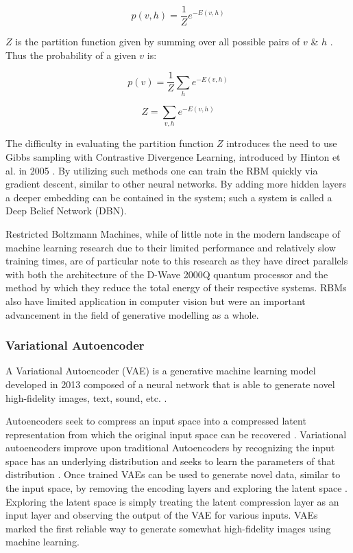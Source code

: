 \documentclass[%
 reprint,
 amsmath,amssymb,
 aps,
]{revtex4-2}
\begin{document}
\begin{equation}
p(v, h) = \frac{1}{Z}e^{-E(v,h)}
\end{equation}



$Z$ is the partition function given by summing over all possible pairs of $v$ \& $h$ \cite{Hinton2012}. Thus the probability of a given $v$ is:

\begin{equation}
p(v) = \frac{1}{Z}\sum_{h} e^{-E(v,h)}
\end{equation}

\begin{equation}
Z = \sum_{v,h}e^{-E(v,h)}
\end{equation}



The difficulty in evaluating the partition function $Z$ introduces the need to use Gibbs sampling with Contrastive Divergence Learning, introduced by Hinton et al. in 2005 \cite{CarreiraPerpin2005OnCD}. By utilizing such methods one can train the RBM quickly via gradient descent, similar to other neural networks. By adding more hidden layers a deeper embedding can be contained in the system; such a system is called a Deep Belief Network (DBN).


Restricted Boltzmann Machines, while of little note in the modern landscape of machine learning research due to their limited performance and relatively slow training times, are of particular note to this research as they have direct parallels with both the architecture of the D-Wave 2000Q quantum processor and the method by which they reduce the total energy of their respective systems. RBMs also have limited application in computer vision but were an important advancement in the field of generative modelling as a whole.



\subsubsection{Variational Autoencoder}
A Variational Autoencoder (VAE) is a generative machine learning model developed in 2013 composed of a neural network that is able to generate novel high-fidelity images, text, sound, etc. \cite{kingma2014autoencoding}.


Autoencoders seek to compress an input space into a compressed latent representation from which the original input space can be recovered \cite{kingma2014autoencoding}. Variational autoencoders improve upon traditional Autoencoders by recognizing the input space has an underlying distribution and seeks to learn the parameters of that distribution \cite{kingma2014autoencoding}. Once trained VAEs can be used to generate novel data, similar to the input space, by removing the encoding layers and exploring the latent space \cite{kingma2014autoencoding}. Exploring the latent space is simply treating the latent compression layer as an input layer and observing the output of the VAE for various inputs. VAEs marked the first reliable way to generate somewhat high-fidelity images using machine learning\cite{rocca_2021}.
\end{document}

